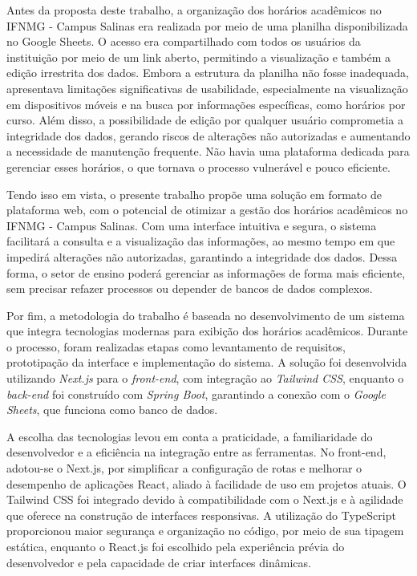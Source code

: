 Antes da proposta deste trabalho, a organização dos horários acadêmicos no IFNMG - Campus Salinas era realizada por meio de uma planilha disponibilizada no Google Sheets. O acesso era compartilhado com todos os usuários da instituição por meio de um link aberto, permitindo a visualização e também a edição irrestrita dos dados. Embora a estrutura da planilha não fosse inadequada, apresentava limitações significativas de usabilidade, especialmente na visualização em dispositivos móveis e na busca por informações específicas, como horários por curso. Além disso, a possibilidade de edição por qualquer usuário comprometia a integridade dos dados, gerando riscos de alterações não autorizadas e aumentando a necessidade de manutenção frequente. Não havia uma plataforma dedicada para gerenciar esses horários, o que tornava o processo vulnerável e pouco eficiente.

Tendo isso em vista, o presente trabalho propõe uma solução em formato de plataforma web, com o potencial de otimizar a gestão dos horários acadêmicos no IFNMG - Campus Salinas. Com uma interface intuitiva e segura, o sistema facilitará a consulta e a visualização das informações, ao mesmo tempo em que impedirá alterações não autorizadas, garantindo a integridade dos dados. Dessa forma, o setor de ensino poderá gerenciar as informações de forma mais eficiente, sem precisar refazer processos ou depender de bancos de dados complexos.

Por fim, a metodologia do trabalho é baseada no desenvolvimento de um sistema que integra tecnologias modernas para exibição dos horários acadêmicos. Durante o processo, foram realizadas etapas como levantamento de requisitos, prototipação da interface e implementação do sistema. A solução foi desenvolvida utilizando \textit{Next.js} para o \textit{front-end}, com integração ao \textit{Tailwind CSS}, enquanto o \textit{back-end} foi construído com \textit{Spring Boot}, garantindo a conexão com o \textit{Google Sheets}, que funciona como banco de dados. 

A escolha das tecnologias levou em conta a praticidade, a familiaridade do desenvolvedor e a eficiência na integração entre as ferramentas. No front-end, adotou-se o Next.js, por simplificar a configuração de rotas e melhorar o desempenho de aplicações React, aliado à facilidade de uso em projetos atuais. O Tailwind CSS foi integrado devido à compatibilidade com o Next.js e à agilidade que oferece na construção de interfaces responsivas. A utilização do TypeScript proporcionou maior segurança e organização no código, por meio de sua tipagem estática, enquanto o React.js foi escolhido pela experiência prévia do desenvolvedor e pela capacidade de criar interfaces dinâmicas.

